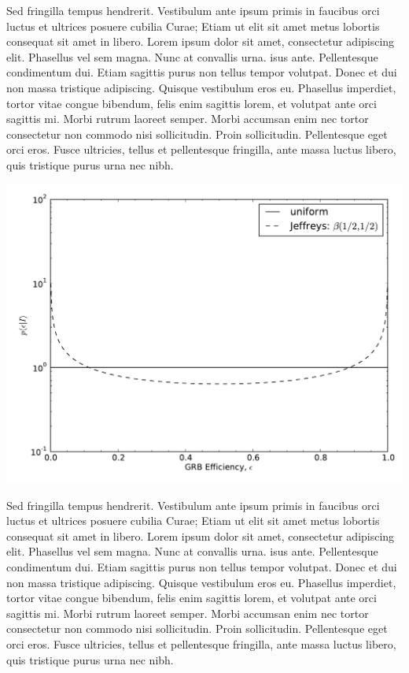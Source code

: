 \documentclass[a0,landscape]{a0poster}
\begin{document}
\begin{multicols}{4}
Sed fringilla tempus hendrerit. Vestibulum ante ipsum primis in faucibus orci
luctus et ultrices posuere cubilia Curae; Etiam ut elit sit amet metus lobortis
consequat sit amet in libero. Lorem ipsum dolor sit amet, consectetur adipiscing
elit. Phasellus vel sem magna. Nunc at convallis urna. isus ante. Pellentesque
condimentum dui. Etiam sagittis purus non tellus tempor volutpat. Donec et dui
non massa tristique adipiscing. Quisque vestibulum eros eu. Phasellus imperdiet,
tortor vitae congue bibendum, felis enim sagittis lorem, et volutpat ante orci
sagittis mi. Morbi rutrum laoreet semper. Morbi accumsan enim nec tortor
consectetur non commodo nisi sollicitudin. Proin sollicitudin. Pellentesque eget
orci eros. Fusce ultricies, tellus et pellentesque fringilla, ante massa luctus
libero, quis tristique purus urna nec nibh.

\begin{center}\vspace{1cm}
        \includegraphics[width=0.48\linewidth]{efficiency_prior.pdf}
\end{center}\vspace{1cm}

Sed fringilla tempus hendrerit. Vestibulum ante ipsum primis in faucibus orci
luctus et ultrices posuere cubilia Curae; Etiam ut elit sit amet metus lobortis
consequat sit amet in libero. Lorem ipsum dolor sit amet, consectetur adipiscing
elit. Phasellus vel sem magna. Nunc at convallis urna. isus ante. Pellentesque
condimentum dui. Etiam sagittis purus non tellus tempor volutpat. Donec et dui
non massa tristique adipiscing. Quisque vestibulum eros eu. Phasellus imperdiet,
tortor vitae congue bibendum, felis enim sagittis lorem, et volutpat ante orci
sagittis mi. Morbi rutrum laoreet semper. Morbi accumsan enim nec tortor
consectetur non commodo nisi sollicitudin. Proin sollicitudin. Pellentesque eget
orci eros. Fusce ultricies, tellus et pellentesque fringilla, ante massa luctus
libero, quis tristique purus urna nec nibh.



\end{multicols}
\end{document}
